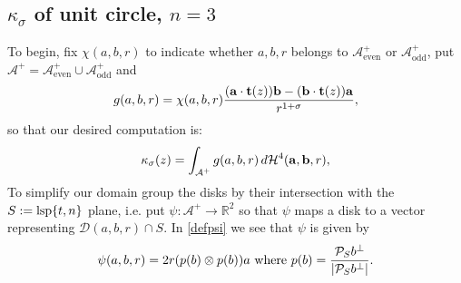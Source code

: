 \documentclass{article}
\newcommand{\aeven}{\mathcal{A}_{\mathrm{even}}^+}
\newcommand{\aodd}{\mathcal{A}_{\mathrm{odd}}^+}
\newcommand{\bec}[1]{\mathbf{#1}}
\newcommand{\sproj}{\mathcal{P}_S}
\newcommand{\lsp}[1]{\mathrm{lsp}\braces{#1}}
\begin{document}
\subsection{$\kappa_\sigma$ of unit circle, $n=3$}
To begin, fix $\chi(a,b,r)$ to indicate whether $a, b, r$ belongs to $\aeven$ or $\aodd$, put $\mathcal{A}^+ = \aeven \cup \aodd$ and
$$
g(a, b, r) = \chi(a, b, r) \frac{\parens{\bec{a} \cdot \bec{t}(z)} \bec{b} - \parens{\bec{b} \cdot \bec{t}(z)}\bec{a}}{r^{1+\sigma}},
$$
so that our desired computation is:
$$
\kappa_\sigma(z) = \int_{\mathcal{A}^+} g(a, b, r) \, d\mathcal{H}^{4}\parens{\bec{a}, \bec{b}, r},
$$
To simplify our domain group the disks by their intersection with the $S := \lsp{t, n}$ plane, i.e. put $\psi : \mathcal{A}^+ \to \mathbb{R}^2$ so that $\psi$ maps a disk to a vector representing $\mathcal{D}(a, b, r) \cap S$. In \ref{defpsi} we see that $\psi$ is given by
$$
  \psi(a, b, r) = 2r \parens{p(b) \otimes p(b)} a \textup{ where } p(b) = \frac{\sproj b^\perp}{\abs{\sproj b^\perp}}.
$$
\end{document}
